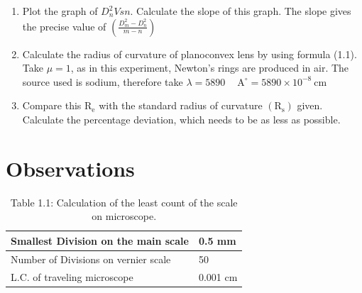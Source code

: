 \documentclass[11pt]{article}
\begin{document}
\begin{enumerate}
\begin{enumerate}
\end{enumerate}
	\item Plot the graph of $D_{n}^{2} V s n$. Calculate the slope of this graph. The slope gives the precise value of $\left(\frac{D_{m}^{2}-D_{n}^{2}}{m-n}\right)$
	\item Calculate the radius of curvature of planoconvex lens by using formula (1.1). Take $\mu=1$, as in this experiment, Newton's rings are produced in air. The source used is sodium, therefore take $\lambda=5890 \quad \mathrm{~A}^{\circ}=5890 \times 10^{-8} \mathrm{~cm}$
	\item Compare this $\mathrm{R}_{\mathrm{e}}$ with the standard radius of curvature $\left(\mathrm{R}_{\mathrm{s}}\right)$ given. Calculate the percentage deviation, which needs to be as less as possible.
	\end{enumerate}
\clearpage

	\section{Observations}

	\begin{table}[H]
\centering
\begin{tabular}{|l|l|}
	\hline Smallest Division on the main scale & 0.5 mm \\
	\hline Number of Divisions on vernier scale & 50\\
	\hline L.C. of traveling microscope & 0.001 cm\\
	\hline
\end{tabular}
\caption{Table 1.1: Calculation of the least count of the scale on microscope.}
\end{table}
\end{document}
